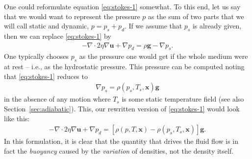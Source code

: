 \documentclass{article}
\begin{document}
One could reformulate equation \eqref{eq:stokes-1} somewhat. To this end, let us
say that we would want to represent the pressure $p$ as the sum of two parts
that we will call static and dynamic, $p=p_s+p_d$. If we assume that $p_s$ is
already given, then we can replace \eqref{eq:stokes-1} by
\begin{gather*}
  -\nabla \cdot 2\eta
  \nabla \mathbf u + \nabla p_d =
  \rho\mathbf g - \nabla p_s.
\end{gather*}
One typically chooses $p_s$ as the pressure one would get if the whole medium
were at rest -- i.e., as the hydrostatic pressure. This pressure can be
computed noting that \eqref{eq:stokes-1} reduces to
\begin{gather*}
  \nabla p_s = \rho(p_s,T_s,\mathbf x)\mathbf g
\end{gather*}
in the absence of any motion where $T_s$ is some static temperature field (see
also Section~\ref{sec:adiabatic}). This, our rewritten version of
\eqref{eq:stokes-1} would look like this:
\begin{gather*}
  -\nabla \cdot 2\eta
  \nabla \mathbf u + \nabla p_d =
  \left[\rho(p,T,\mathbf x)-\rho(p_s,T_s,\mathbf x)\right]\mathbf g.
\end{gather*}
In this
formulation, it is clear that the quantity that drives the fluid flow is in
fact the \textit{buoyancy} caused by the \textit{variation} of densities,
not the density itself.
\end{document}
